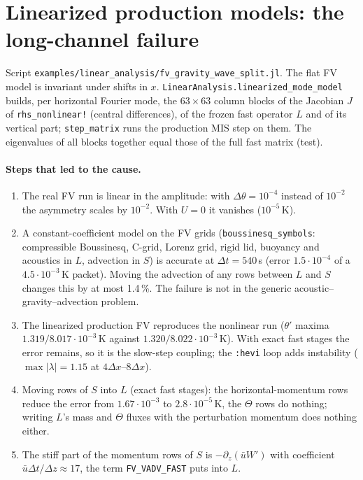 \documentclass[11pt,a4paper]{article}
\newcommand{\code}[1]{\texttt{#1}}
\newcommand{\dt}{\Delta t}
\begin{document}
\section{Linearized production models: the long-channel failure}\label{sec:linprod}

Script \code{examples/linear\_analysis/fv\_gravity\_wave\_split.jl}. The flat FV model is invariant
under shifts in $x$. \code{LinearAnalysis.linearized\_mode\_model} builds, per horizontal Fourier mode,
the $63\times63$ column blocks of the Jacobian $J$ of \code{rhs\_nonlinear!} (central differences),
of the frozen fast operator $L$ and of its vertical part; \code{step\_matrix} runs the production MIS
step on them. The eigenvalues of all blocks together equal those of the full fast matrix (test).

\paragraph{Steps that led to the cause.}
\begin{enumerate}
\item The real FV run is linear in the amplitude: with $\Delta\theta = 10^{-4}$ instead of
  $10^{-2}$ the asymmetry scales by $10^{-2}$. With $U = 0$ it vanishes ($10^{-5}$\,K).
\item A constant-coefficient model on the FV grids (\code{boussinesq\_symbols}: compressible
  Boussinesq, C-grid, Lorenz grid, rigid lid, buoyancy and acoustics in $L$, advection in $S$) is
  accurate at $\dt = 540$\,s (error $1.5\cdot10^{-4}$ of a $4.5\cdot10^{-3}$\,K packet). Moving the
  advection of any rows between $L$ and $S$ changes this by at most 1.4\,\%. The failure is not in the
  generic acoustic--gravity--advection problem.
\item The linearized production FV reproduces the nonlinear run ($\theta'$ maxima
  $1.319/8.017\cdot10^{-3}$\,K against $1.320/8.022\cdot10^{-3}$\,K). With exact fast stages the error
  remains, so it is the slow-step coupling; the \code{:hevi} loop adds instability
  ($\max|\lambda| = 1.15$ at $4\Delta x$--$8\Delta x$).
\item Moving rows of $S$ into $L$ (exact fast stages): the horizontal-momentum rows reduce the error
  from $1.67\cdot10^{-3}$ to $2.8\cdot10^{-5}$\,K, the $\Theta$ rows do nothing; writing $L$'s mass and
  $\Theta$ fluxes with the perturbation momentum does nothing either.
\item The stiff part of the momentum rows of $S$ is $-\partial_z(\bar u W')$ with coefficient
  $\bar u\dt/\Delta z\approx17$, the term \code{FV\_VADV\_FAST} puts into $L$.
\end{enumerate}
\end{document}
